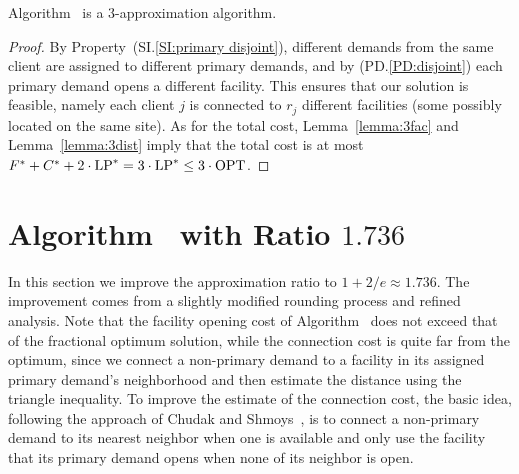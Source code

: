 \documentclass[11pt]{article}
\begin{document}
\begin{theorem}
Algorithm~{\EGUP} is a $3$-approximation algorithm.
\end{theorem}

\begin{proof}
  By Property~(SI.\ref{SI:primary disjoint}), different
  demands from the same client are assigned to different
  primary demands, and by (PD.\ref{PD:disjoint}) each primary
  demand opens a different facility. This ensures that our
  solution is feasible, namely each client $j$ is connected
  to $r_j$ different facilities (some possibly located on
  the same site).  As for the total cost,
  Lemma~\ref{lemma:3fac} and Lemma~\ref{lemma:3dist} imply
  that the total cost is at most
  $F^\ast+C^\ast+2\cdot\mbox{\rm LP}^\ast = 3\cdot\mbox{\rm LP}^\ast \leq
  3\cdot\mbox{\rm OPT}$.
\end{proof}



\section{Algorithm~{\ECHS} with Ratio $1.736$}\label{sec: 1.736-approximation}

In this section we improve the approximation ratio to $1+2/e \approx
1.736$. The improvement comes from a slightly modified rounding
process and refined analysis.  Note that the facility opening cost of
Algorithm~{\EGUP} does not exceed that of the fractional optimum
solution, while the connection cost is quite far from the optimum,
since we connect a non-primary demand to a facility in its assigned
primary demand's neighborhood and then estimate the distance using the
triangle inequality. To improve the estimate of the connection cost,
the basic idea, following the approach of Chudak and
Shmoys~\cite{ChudakS04}, is to connect a non-primary demand to its
nearest neighbor when one is available and only use the facility that
its primary demand opens when none of its neighbor is open.

\end{document}

